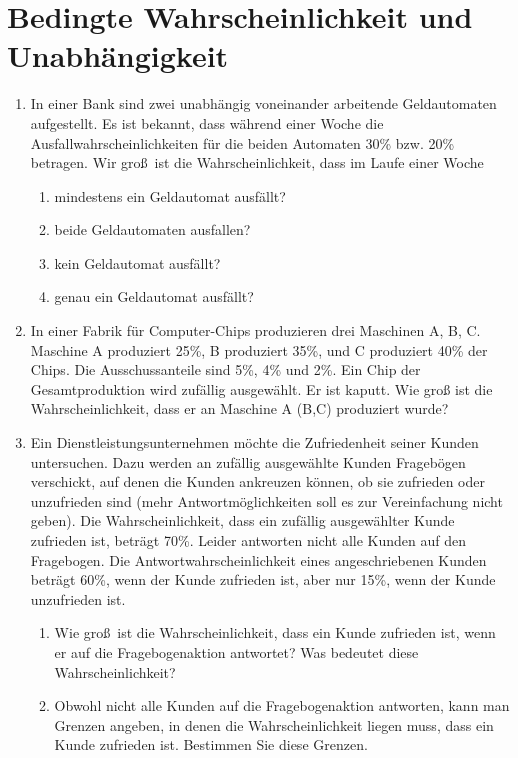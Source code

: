 \section[Bed.~Wahrscheinlichkeit]{Bedingte Wahrscheinlichkeit und Unabhängigkeit}

\begin{enumerate}
\item In einer Bank sind zwei unabh\"{a}ngig voneinander arbeitende
Geldautomaten aufgestellt. Es ist bekannt, dass w\"{a}hrend einer Woche die
Ausfallwahrscheinlichkeiten f\"{u}r die beiden Automaten 30\% bzw. 20\%
betragen. Wir gro\ss\ ist die Wahrscheinlichkeit, dass im Laufe einer Woche
\begin{enumerate}
\item mindestens ein Geldautomat ausf\"{a}llt?
\item beide Geldautomaten ausfallen?
\item kein Geldautomat ausf\"{a}llt?
\item genau ein Geldautomat ausf\"{a}llt?
\end{enumerate}

\item In einer Fabrik f\"{u}r Computer-Chips produzieren drei Maschinen A,
B, C. Maschine A produziert 25\%, B produziert 35\%, und C produziert 40\%
der Chips. Die Ausschussanteile sind 5\%, 4\% und 2\%. Ein Chip der
Gesamtproduktion wird zuf\"{a}llig ausgew\"{a}hlt. Er ist kaputt. Wie groß
ist die Wahrscheinlichkeit, dass er an Maschine A (B,C) produziert
wurde?

\item Ein Dienstleistungsunternehmen m\"{o}chte die Zufriedenheit seiner
Kunden untersuchen. Dazu werden an zuf\"{a}llig ausgew\"{a}hlte Kunden 
Fragebögen verschickt, auf denen die Kunden ankreuzen k\"{o}nnen, ob sie
zufrieden oder unzufrieden sind (mehr Antwortm\"{o}glichkeiten soll es zur
Vereinfachung nicht geben). Die Wahrscheinlichkeit, dass ein zuf\"{a}llig
ausgew\"{a}hlter Kunde zufrieden ist, betr\"{a}gt 70\%. Leider antworten
nicht alle Kunden auf den Fragebogen. Die Antwortwahrscheinlichkeit eines
angeschriebenen Kunden betr\"{a}gt 60\%, wenn der Kunde zufrieden ist, aber
nur 15\%, wenn der Kunde unzufrieden ist.
\begin{enumerate}
\item Wie gro\ss\ ist die Wahrscheinlichkeit, dass ein Kunde zufrieden ist,
wenn er auf die Fragebogenaktion antwortet? Was bedeutet diese
Wahrscheinlichkeit?
\item Obwohl nicht alle Kunden auf die Fragebogenaktion antworten, kann man
Grenzen angeben, in denen die Wahrscheinlichkeit liegen muss, dass ein Kunde
zufrieden ist. Bestimmen Sie diese Grenzen.
\end{enumerate}


\end{enumerate}
